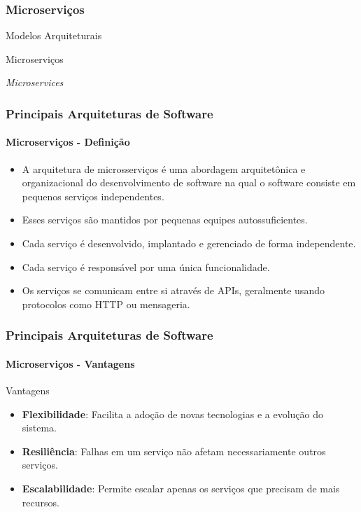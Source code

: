 \documentclass[
	10pt, %
	t, %
]{beamer}
\begin{document}
\subsubsection{Microserviços}

\begin{frame}
	\begin{center}
		
		\bigskip\bigskip\bigskip\bigskip %
		{\Large Modelos Arquiteturais}
		
		\bigskip\bigskip %
		{\Huge Microserviços}
		
		\smallskip
		{\small \textit{Microservices}}
	\end{center}

\end{frame}

\begin{frame}
	\frametitle{Principais Arquiteturas de Software}
	\framesubtitle{Microserviços - Definição}

	\begin{itemize}
		\item A arquitetura de microsserviços é uma abordagem arquitetônica e organizacional do desenvolvimento de software na qual o software consiste em \alert{pequenos serviços independentes}.
		\item Esses serviços são mantidos por \alert{pequenas equipes autossuficientes}.
		\item Cada serviço é desenvolvido, implantado e gerenciado de forma \alert{independente}.
		\item Cada serviço é responsável por uma \alert{única funcionalidade}.
		\item Os serviços se comunicam entre si através de \alert{APIs}, geralmente usando protocolos como HTTP ou mensageria.
	\end{itemize}

\end{frame}

\begin{frame}
	\frametitle{Principais Arquiteturas de Software}
	\framesubtitle{Microserviços - Vantagens}

	\begin{exampleblock}{Vantagens}
		\begin{itemize}
			\item \textbf{Flexibilidade}: Facilita a adoção de novas tecnologias e a evolução do sistema.
			\item \textbf{Resiliência}: Falhas em um serviço não afetam necessariamente outros serviços.
			\item \textbf{Escalabilidade}: Permite escalar apenas os serviços que precisam de mais recursos.
		\end{itemize}
	\end{exampleblock}
\end{frame}
\end{document}
